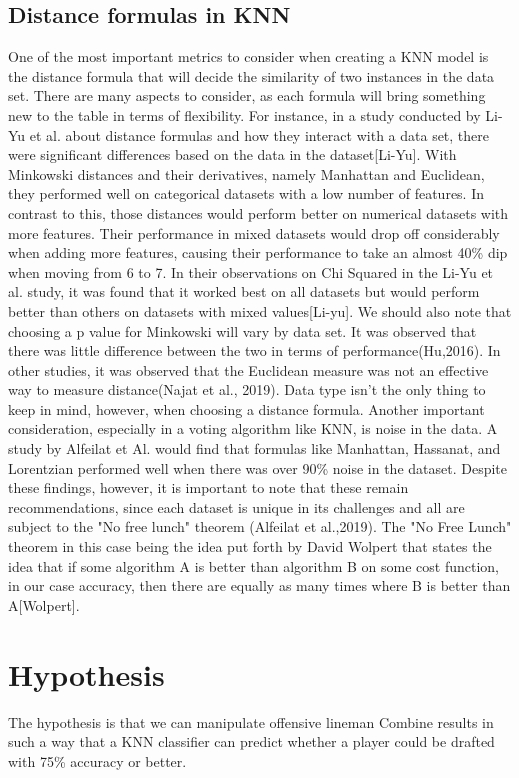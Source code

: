\documentclass[confrence]{IEEEtran}
\begin{document}
\subsection*{Distance formulas in KNN}
One of the most important metrics to consider when creating a KNN model is the distance formula that will decide the similarity of two instances in the data set.
There are many aspects to consider, as each formula will bring something new to the table in terms of flexibility. For instance, in a study conducted by Li-Yu et al. about distance formulas and how they interact with a data set, there were significant differences based on the data in the dataset[Li-Yu].
With Minkowski distances and their derivatives, namely Manhattan and Euclidean, they performed well on categorical datasets with a low number of features.
In contrast to this, those distances would perform better on numerical datasets with more features.
Their performance in mixed datasets would drop off considerably when adding more features, causing their performance to take an almost 40\% dip when moving from 6 to 7.
In their observations on Chi Squared in the Li-Yu et al. study, it was found that it worked best on all datasets but would perform better than others on datasets with mixed values[Li-yu].
We should also note that choosing a p value for Minkowski will vary by data set. It was observed that there was little difference between the two in terms of performance(Hu,2016).
In other studies, it was observed that the Euclidean measure was not an effective way to measure distance(Najat et al., 2019). Data type isn't the only thing to keep in mind, however, when choosing a distance formula.
Another important consideration, especially in a voting algorithm like KNN, is noise in the data. A study by Alfeilat et Al. would find that formulas like Manhattan, Hassanat, and Lorentzian performed well when there was over 90\% noise in the dataset.
Despite these findings, however, it is important to note that these remain recommendations, since each dataset is unique in its challenges and all are subject to the "No free lunch" theorem (Alfeilat et al.,2019).
The "No Free Lunch" theorem in this case being the idea put forth by David Wolpert that states the idea that if some algorithm A is better than algorithm B on some cost function, in our case accuracy, then there are equally as many times where B is better than A[Wolpert].
\section*{Hypothesis}
The hypothesis is that we can manipulate offensive lineman Combine results in such a way that a KNN classifier can predict whether a player could be drafted with 75\% accuracy or better.
\end{document}
